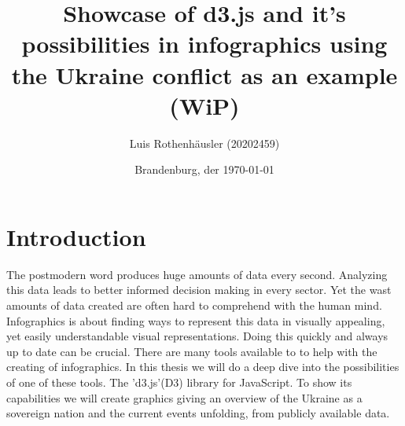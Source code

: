 \documentclass[
a4paper,     %
12pt         %
]{scrartcl}  %
\title{Showcase of d3.js and it's possibilities in infographics using the Ukraine conflict as an example (WiP)}
\author{Luis Rothenh\"ausler (20202459)}
\date{Brandenburg, der \today{}}
\begin{document}

 \maketitle

\tableofcontents





\newpage

\section{Introduction}
The postmodern word produces huge amounts of data every second. Analyzing this data leads to better informed decision making in every sector. Yet the wast amounts of data created are often hard to comprehend with the human mind. Infographics is about finding ways to represent this data in visually appealing, yet easily understandable visual representations. Doing this quickly and always up to date can be crucial. There are many tools available to to help with the creating of infographics. In this thesis we will do a deep dive into the possibilities of one of these tools. The 'd3.js'(D3) library for JavaScript. To show its capabilities we will create graphics giving an overview of the Ukraine as a sovereign nation and the current events unfolding, from publicly available data.
\end{document}

